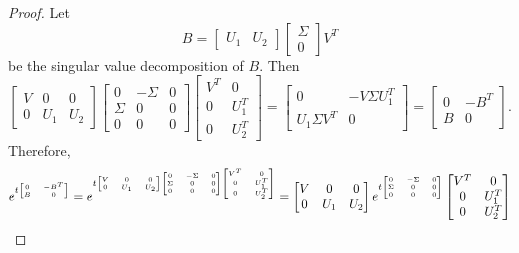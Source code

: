 \begin{proof}
	Let 
	\[
		B = \begin{bmatrix} U_1 & U_2 \end{bmatrix} \begin{bmatrix} \Sigma \\ 0 \end{bmatrix} V^T
	\]
	be the singular value decomposition of $B$. Then
	\[
		\begin{bmatrix} V & 0 & 0 \\ 0 & U_1 & U_2 \end{bmatrix} \begin{bmatrix} 0 & -\Sigma & 0 \\ \Sigma & 0 & 0 \\ 0 & 0 & 0 \end{bmatrix} \begin{bmatrix} V^T & 0 \\ 0 & U_1^T \\ 0 & U_2^T \end{bmatrix} = \begin{bmatrix} 0 & -V \Sigma U_1^T \\ U_1 \Sigma V^T & 0  \end{bmatrix} = \begin{bmatrix} 0 & -B^T \\ B & 0 \end{bmatrix}.
	\]
	Therefore,
	\begin{multline}\label{eq:cs decomp}
		e^{t {\tiny\begin{bmatrix} 0 & -B^T \\ B & 0 \end{bmatrix}}} = e^{t {\tiny \begin{bmatrix} V & 0 & 0 \\ 0 & U_1 & U_2 \end{bmatrix} \begin{bmatrix} 0 & -\Sigma & 0 \\ \Sigma & 0 & 0 \\ 0 & 0 & 0 \end{bmatrix} \begin{bmatrix} V^T & 0 \\ 0 & U_1^T \\ 0 & U_2^T \end{bmatrix}}} = \begin{bmatrix} V & 0 & 0 \\ 0 & U_1 & U_2 \end{bmatrix} e^{t \tiny{\begin{bmatrix} 0 & -\Sigma & 0 \\ \Sigma & 0 & 0 \\ 0 & 0 & 0 \end{bmatrix}}} \begin{bmatrix} V^T & 0 \\ 0 & U_1^T \\ 0 & U_2^T \end{bmatrix} \\

\end{multline}
\end{proof}
